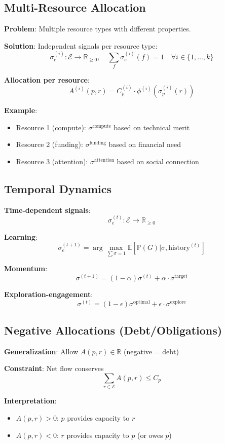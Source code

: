 \documentclass[11pt,a4paper]{article}
\theoremstyle{definition}
\theoremstyle{remark}
\newcommand{\E}{\mathcal{E}}
\begin{document}
\subsection{Multi-Resource Allocation}

\textbf{Problem}: Multiple resource types with different properties.

\textbf{Solution}: Independent signals per resource type:
\[ \sigma_e^{(i)}: \E \to \mathbb{R}_{\ge 0}, \quad \sum_f \sigma_e^{(i)}(f) = 1 \quad \forall i \in \{1, \ldots, k\} \]

\textbf{Allocation per resource}:
\[ A^{(i)}(p,r) = C_p^{(i)} \cdot \phi^{(i)}(\sigma_p^{(i)}(r)) \]

\textbf{Example}:
\begin{itemize}
\item Resource 1 (compute): $\sigma^{\text{compute}}$ based on technical merit
\item Resource 2 (funding): $\sigma^{\text{funding}}$ based on financial need  
\item Resource 3 (attention): $\sigma^{\text{attention}}$ based on social connection
\end{itemize}

\subsection{Temporal Dynamics}

\textbf{Time-dependent signals}:
\[ \sigma_e^{(t)}: \E \to \mathbb{R}_{\ge 0} \]

\textbf{Learning}:
\[ \sigma_e^{(t+1)} = \arg\max_{\sum \sigma = 1} \mathbb{E}[\mathbb{P}(G) | \sigma, \text{history}^{(t)}] \]

\textbf{Momentum}:
\[ \sigma^{(t+1)} = (1-\alpha)\sigma^{(t)} + \alpha \cdot \sigma^{\text{target}} \]

\textbf{Exploration-engagement}:
\[ \sigma^{(t)} = (1-\epsilon)\sigma^{\text{optimal}} + \epsilon \cdot \sigma^{\text{explore}} \]

\subsection{Negative Allocations (Debt/Obligations)}

\textbf{Generalization}: Allow $A(p,r) \in \mathbb{R}$ (negative = debt)

\textbf{Constraint}: Net flow conserves
\[ \sum_{r \in \E} A(p,r) \le C_p \]

\textbf{Interpretation}:
\begin{itemize}
\item $A(p,r) > 0$: $p$ provides capacity to $r$
\item $A(p,r) < 0$: $r$ provides capacity to $p$ (or owes $p$)
\end{itemize}
\end{document}
